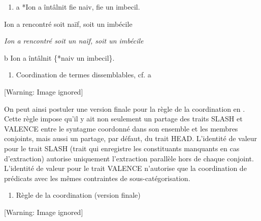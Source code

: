 \begin{enumerate}
\item \label{bkm:Ref302068906}a  *Ion  a  întâlnit  fie  naiv,  fie  un  imbecil.


\end{enumerate}
Ion  a  rencontré  soit  naïf,  soit  un  imbécile

{\itshape
Ion a rencontré soit un naïf, soit un imbécile}

  b  Ion a întâlnit \{*naiv {\textbar} un imbecil\}.


\begin{enumerate}
\item \label{bkm:Ref301713260}Coordination de termes dissemblables, cf. a


\end{enumerate}
{   [Warning: Image ignored] %
} 

On peut ainsi postuler une version finale pour la règle de la coordination en . Cette règle impose qu'il y ait non seulement un partage des traits SLASH et VALENCE entre le syntagme coordonné dans son ensemble et les membres conjoints, mais aussi un partage, par défaut, du trait HEAD. L'identité de valeur pour le trait SLASH (trait qui enregistre les constituants manquants en cas d'extraction) autorise uniquement l'extraction parallèle hors de chaque conjoint. L'identité de valeur pour le trait VALENCE n'autorise que la coordination de prédicats avec les mêmes contraintes de sous-catégorisation. 


\begin{enumerate}
\item \label{bkm:Ref290407646}Règle de la coordination (version finale)


\end{enumerate}
  [Warning: Image ignored] %
  

